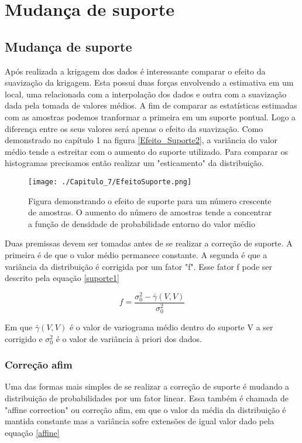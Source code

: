 \chapter{Mudança de suporte}


\section{Mudança de suporte}

Após realizada a krigagem dos dados é interessante comparar o efeito da suavização da krigagem. Esta possui duas forças envolvendo a estimativa em um local, uma relacionada com a interpolação dos dados e outra com a suavização dada pela tomada de valores médios. A fim de comparar as estatísticas estimadas com as amostras podemos tranformar a primeira em um suporte pontual. Logo a diferença entre os seus valores será apenas o efeito da suavização. Como demonstrado no capítulo 1 na figura \eqref{Efeito_Suporte2}, a variância do valor médio tende a estreitar com o aumento do suporte utilizado. Para comparar os histogramas precisamos então realizar um "esticamento" da distribuição.


\begin{figure}[H]
	\texttt{[image: ./Capitulo\_7/EfeitoSuporte.png]}	
	\caption{Figura demonstrando o efeito de suporte para um número crescente de amostras. O aumento do número de amostras tende a concentrar a  função de densidade de probabilidade entorno do valor médio }
	\label{Efeito_Suporte2}
\end{figure} 

Duas premissas devem ser tomadas antes de se realizar a correção de suporte. A primeira é de que o valor médio permanece constante. A segunda é que a variância da distribuição é corrigida por um fator "f". Esse fator f pode ser descrito pela equação \eqref{suporte1}

\begin{equation}\label{suporte1}
	f= \frac{\sigma^2_{0} - \bar{\gamma}(V,V)}{\sigma^2_{0}}
\end{equation}

Em que $\bar{\gamma}(V,V)$ é o valor de variograma médio dentro do suporte V a ser corrigido e $\sigma^2_{0}$ é o valor de variância à priori dos dados. 

\subsection{Correção afim}

Uma das formas mais simples de se realizar a correção de suporte é mudando a distribuição de probabilidades por um fator linear. Essa também é chamada de "affine correction" ou correção afim, em que o valor da média da distribuição é mantida constante mas a variância sofre extensões de igual valor dado pela equação  \eqref{affine}

